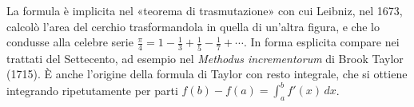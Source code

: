 \begin{notastorica}
La formula è implicita nel «teorema di trasmutazione» con cui Leibniz, nel 1673, calcolò
l'area del cerchio trasformandola in quella di un'altra figura, e che lo condusse alla
celebre serie $\frac\pi4=1-\frac13+\frac15-\frac17+\cdots$. In forma esplicita compare nei trattati
del Settecento, ad esempio nel \emph{Methodus incrementorum} di Brook Taylor (1715). È anche l'origine della formula di Taylor
con resto integrale, che si ottiene integrando ripetutamente per parti
$f(b)-f(a)=\int_{a}^{b}f'(x)\,dx$.
\end{notastorica}
